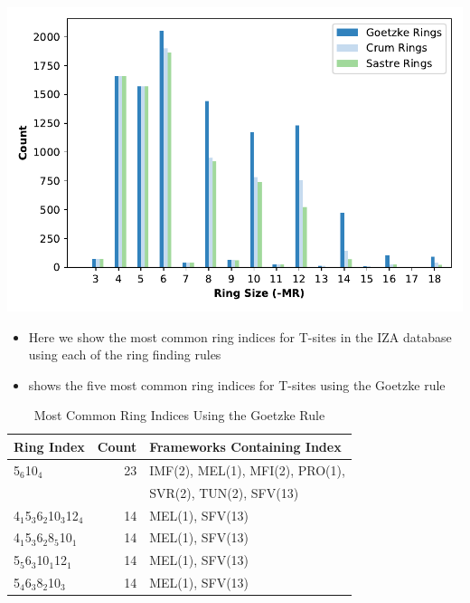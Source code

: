 \documentclass[11pt]{article}
\begin{document}
\begin{center}
\includegraphics[width=.6\textwidth]{../figures/completed-figures/osite-ring-counts.pdf}
\end{center}
\begin{itemize}
\item Here we show the most common ring indices for T-sites in the IZA database using each of the ring finding rules
\item {} shows the five most common ring indices for T-sites using the Goetzke  rule
\end{itemize}
\begin{table}[htbp]
\caption{Most Common Ring Indices Using the Goetzke Rule \label{tab:goetzke-ts}}
\centering
\begin{tabular}{lrl}
Ring Index & Count & Frameworks Containing Index\\
\hline
5\(_{\text{6}}\)\textbullet{}10\(_{\text{4}}\) & 23 & IMF(2), MEL(1), MFI(2), PRO(1),\\
 &  & SVR(2), TUN(2), SFV(13)\\
4\(_{\text{1}}\)\textbullet{}5\(_{\text{3}}\)\textbullet{}6\(_{\text{2}}\)\textbullet{}10\(_{\text{3}}\)\textbullet{}12\(_{\text{4}}\) & 14 & MEL(1), SFV(13)\\
4\(_{\text{1}}\)\textbullet{}5\(_{\text{3}}\)\textbullet{}6\(_{\text{2}}\)\textbullet{}8\(_{\text{5}}\)\textbullet{}10\(_{\text{1}}\) & 14 & MEL(1), SFV(13)\\
5\(_{\text{5}}\)\textbullet{}6\(_{\text{3}}\)\textbullet{}10\(_{\text{1}}\)\textbullet{}12\(_{\text{1}}\) & 14 & MEL(1), SFV(13)\\
5\(_{\text{4}}\)\textbullet{}6\(_{\text{3}}\)\textbullet{}8\(_{\text{2}}\)\textbullet{}10\(_{\text{3}}\) & 14 & MEL(1), SFV(13)\\
\end{tabular}
\end{table}
\end{document}
